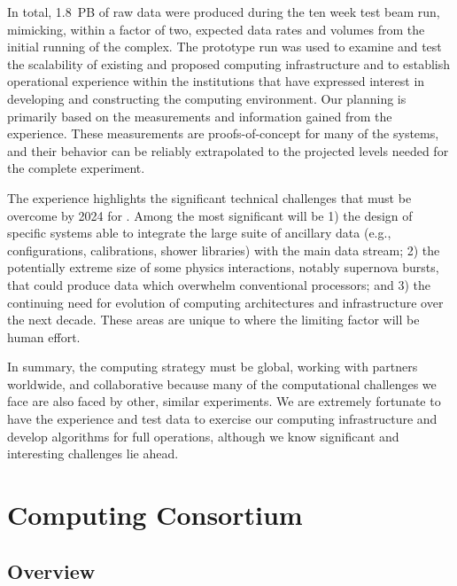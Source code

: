 In total, \SI{1.8}{PB} of raw data were produced during the ten week test beam run, mimicking, within a factor of two, expected data rates and volumes from the initial running of the  complex.  The prototype run was used to examine and test the scalability of existing and proposed computing infrastructure and to establish operational experience within the institutions that have expressed interest in developing and constructing the  computing environment.  Our planning is primarily based on the measurements and information gained from the  experience.  These measurements are proofs-of-concept for many of the systems, and their behavior can be reliably extrapolated to the projected levels needed for the complete  experiment. 

The  experience highlights the significant technical challenges that must be overcome by 2024 for . Among the most significant will be  1) the design of  specific systems able to integrate the large suite of ancillary data (e.g., configurations, calibrations, shower libraries) with the main  data stream; 2) the potentially extreme size of some physics interactions, notably supernova bursts, that could produce data which overwhelm conventional processors; and 3) the continuing need for evolution of computing architectures and infrastructure over the next decade. These areas are unique to  where the limiting factor will be human effort. 

In summary, the  computing strategy must be global, working with partners worldwide, and collaborative because many of the computational challenges we face are also %
faced by other, similar experiments.  We are extremely fortunate to have the  experience and test data to exercise our computing infrastructure and develop algorithms for full  operations, although we know significant and interesting challenges lie ahead. 
 
\section{Computing Consortium}
\subsection{Overview}
\label{ch:exec-comp-ovr}

